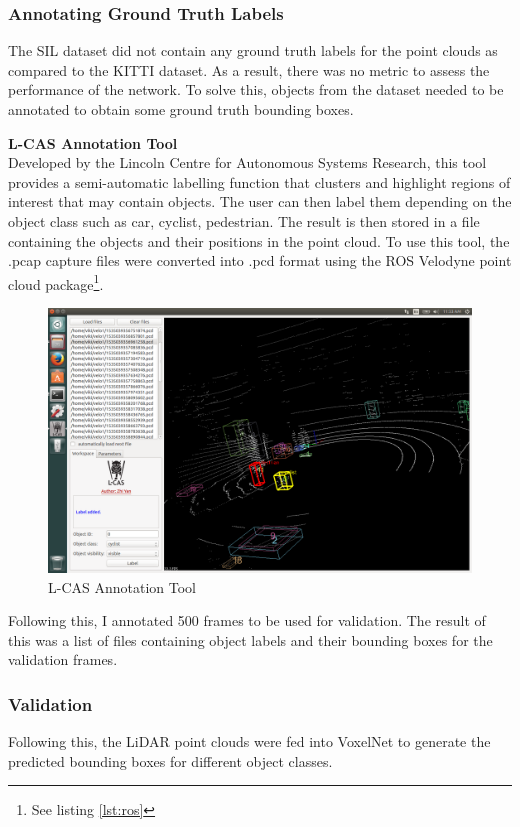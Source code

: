 \subsubsection*{Annotating Ground Truth Labels}
The SIL dataset did not contain any ground truth labels for the point clouds as compared to the KITTI dataset. As a result, there was no metric to assess the performance of the network. To solve this, objects from the dataset needed to be annotated to obtain some ground truth bounding boxes. 

\noindent
\textbf{L-CAS Annotation Tool} \\ 
Developed by the Lincoln Centre for Autonomous Systems Research, this tool provides a semi-automatic labelling function that clusters and highlight regions of interest that may contain objects. The user can then label them depending on the object class such as car, cyclist, pedestrian. The result is then stored in a file containing the objects and their positions in the point cloud. 
To use this tool, the .pcap capture files were converted into .pcd format using the 
ROS Velodyne point cloud package\footnote{See listing \ref{lst:ros}}. 

\begin{figure}[h]
	
	\includegraphics[width=\linewidth]{images/annot.png}
	\caption{L-CAS Annotation Tool}
	\label{fig:annot}
\end{figure}
Following this, I annotated 500 frames to be used for validation. The result of this was a list of files containing object labels and their bounding boxes for the validation frames.

\subsubsection{Validation}
Following this, the LiDAR point clouds were fed into VoxelNet to generate the predicted bounding boxes for different object classes. 


